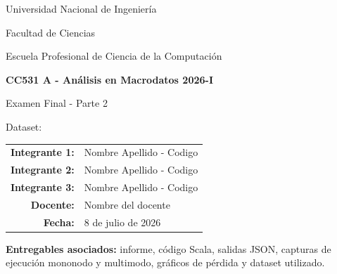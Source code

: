 \begin{titlepage}
    \centering
    {\Large Universidad Nacional de Ingenier\'ia \par}
    \vspace{0.2cm}
    {\large Facultad de Ciencias \par}
    \vspace{0.1cm}
    {\large Escuela Profesional de Ciencia de la Computaci\'on \par}
    \vspace{1.2cm}

    {\Large \textbf{CC531 A - An\'alisis en Macrodatos 2026-I}\par}
    \vspace{0.4cm}
    {\large Examen Final - Parte 2\par}
    \vspace{1.6cm}

    {\Huge \textbf{\projecttitle}\par}
    \vspace{1.0cm}
    {\Large Dataset: \datasetname\par}

    \vfill

    \begin{tabular}{rl}
        \textbf{Integrante 1:} & Nombre Apellido - Codigo \\
        \textbf{Integrante 2:} & Nombre Apellido - Codigo \\
        \textbf{Integrante 3:} & Nombre Apellido - Codigo \\
        \textbf{Docente:} & Nombre del docente \\
        \textbf{Fecha:} & 8 de julio de 2026 \\
    \end{tabular}

    \vfill

    \textbf{Entregables asociados:} informe, c\'odigo Scala, salidas JSON, capturas de ejecuci\'on mononodo y multimodo, gr\'aficos de p\'erdida y dataset utilizado.
\end{titlepage}
